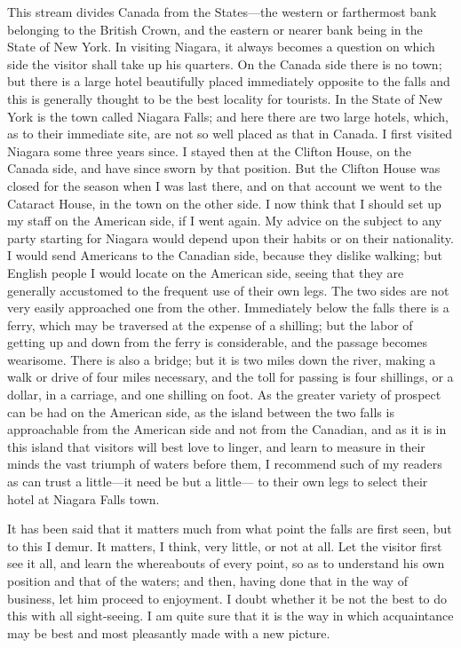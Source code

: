 This stream divides Canada from the States---the western or
farthermost bank belonging to the British Crown, and the eastern or
nearer bank being in the State of New York.  In visiting Niagara,
it always becomes a question on which side the visitor shall take
up his quarters.  On the Canada side there is no town; but there is
a large hotel beautifully placed immediately opposite to the falls
and this is generally thought to be the best locality for tourists.
In the State of New York is the town called Niagara Falls; and here
there are two large hotels, which, as to their immediate site, are
not so well placed as that in Canada.  I first visited Niagara some
three years since.  I stayed then at the Clifton House, on the
Canada side, and have since sworn by that position.  But the
Clifton House was closed for the season when I was last there, and
on that account we went to the Cataract House, in the town on the
other side.  I now think that I should set up my staff on the
American side, if I went again.  My advice on the subject to any
party starting for Niagara would depend upon their habits or on
their nationality.  I would send Americans to the Canadian side,
because they dislike walking; but English people I would locate on
the American side, seeing that they are generally accustomed to the
frequent use of their own legs.  The two sides are not very easily
approached one from the other.  Immediately below the falls there
is a ferry, which may be traversed at the expense of a shilling;
but the labor of getting up and down from the ferry is
considerable, and the passage becomes wearisome.  There is also a
bridge; but it is two miles down the river, making a walk or drive
of four miles necessary, and the toll for passing is four
shillings, or a dollar, in a carriage, and one shilling on foot.
As the greater variety of prospect can be had on the American side,
as the island between the two falls is approachable from the
American side and not from the Canadian, and as it is in this
island that visitors will best love to linger, and learn to measure
in their minds the vast triumph of waters before them, I recommend
such of my readers as can trust a little---it need be but a little---%
to their own legs to select their hotel at Niagara Falls town.

It has been said that it matters much from what point the falls are
first seen, but to this I demur.  It matters, I think, very little,
or not at all.  Let the visitor first see it all, and learn the
whereabouts of every point, so as to understand his own position
and that of the waters; and then, having done that in the way of
business, let him proceed to enjoyment.  I doubt whether it be not
the best to do this with all sight-seeing.  I am quite sure that it
is the way in which acquaintance may be best and most pleasantly
made with a new picture.


